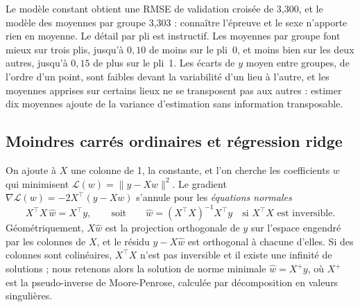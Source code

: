 \documentclass[11pt,a4paper]{article}
\begin{document}
Le modèle constant obtient une RMSE de validation croisée de 3,300, et le modèle des moyennes par groupe 3,303 :
connaître l'épreuve et le sexe n'apporte rien en moyenne. Le détail par pli est instructif. Les moyennes par groupe
font mieux sur trois plis, jusqu'à $0{,}10$ de moins sur le pli~0, et moins bien sur les deux autres, jusqu'à $0{,}15$
de plus sur le pli~1. Les écarts de $y$ moyen entre groupes, de l'ordre d'un point, sont faibles devant la variabilité
d'un lieu à l'autre, et les moyennes apprises sur certains lieux ne se transposent pas aux autres : estimer dix
moyennes ajoute de la variance d'estimation sans information transposable.

\subsection{Moindres carrés ordinaires et régression ridge}\label{sec:ridge}

On ajoute à $X$ une colonne de 1, la constante, et l'on cherche les coefficients $w$ qui minimisent
$\mathcal{L}(w) = \lVert y - Xw\rVert^2$. Le gradient $\nabla\mathcal{L}(w) = -2X^\top(y - Xw)$ s'annule pour les
\emph{équations normales}
\[
X^\top X\,\hat w = X^\top y, \qquad \text{soit} \qquad \hat w = (X^\top X)^{-1}X^\top y
\quad \text{si } X^\top X \text{ est inversible.}
\]
Géométriquement, $X\hat w$ est la projection orthogonale de $y$ sur l'espace engendré par les colonnes de $X$, et le
résidu $y - X\hat w$ est orthogonal à chacune d'elles. Si des colonnes sont colinéaires, $X^\top X$ n'est pas
inversible et il existe une infinité de solutions ; nous retenons alors la solution de norme minimale
$\hat w = X^+ y$, où $X^+$ est la pseudo-inverse de Moore-Penrose, calculée par décomposition en valeurs singulières.
\end{document}
